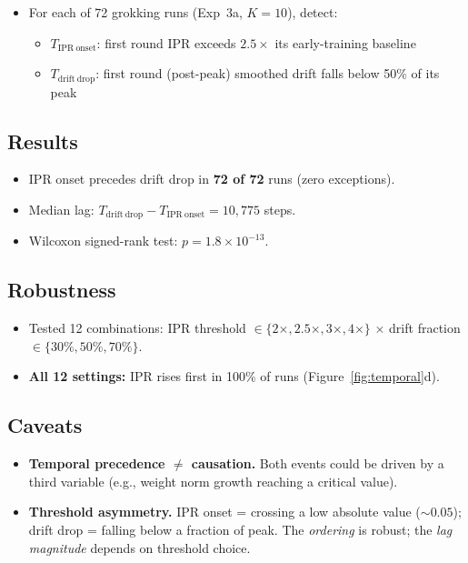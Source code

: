 \documentclass[11pt]{article}
\begin{document}
\begin{itemize}
  \item For each of 72 grokking runs (Exp~3a, $K{=}10$), detect:
  \begin{itemize}
    \item $T_{\mathrm{IPR\ onset}}$: first round IPR exceeds $2.5\times$
          its early-training baseline
    \item $T_{\mathrm{drift\ drop}}$: first round (post-peak) smoothed
          drift falls below 50\% of its peak
  \end{itemize}
\end{itemize}

\subsection{Results}

\begin{itemize}
  \item IPR onset precedes drift drop in \textbf{72 of 72} runs
        (zero exceptions).
  \item Median lag: $T_{\mathrm{drift\ drop}} - T_{\mathrm{IPR\ onset}}
        = 10{,}775$ steps.
  \item Wilcoxon signed-rank test: $p = 1.8 \times 10^{-13}$.
\end{itemize}

\subsection{Robustness}

\begin{itemize}
  \item Tested 12 combinations: IPR threshold
        $\in \{2\times, 2.5\times, 3\times, 4\times\}$ $\times$
        drift fraction $\in \{30\%, 50\%, 70\%\}$.
  \item \textbf{All 12 settings:} IPR rises first in 100\% of runs
        (Figure~\ref{fig:temporal}d).
\end{itemize}

\subsection{Caveats}

\begin{itemize}
  \item \textbf{Temporal precedence $\neq$ causation.} Both events could
        be driven by a third variable (e.g., weight norm growth reaching
        a critical value).
  \item \textbf{Threshold asymmetry.} IPR onset = crossing a low absolute
        value (${\sim}0.05$); drift drop = falling below a fraction of peak.
        The \emph{ordering} is robust; the \emph{lag magnitude} depends on
        threshold choice.
\end{itemize}
\end{document}
